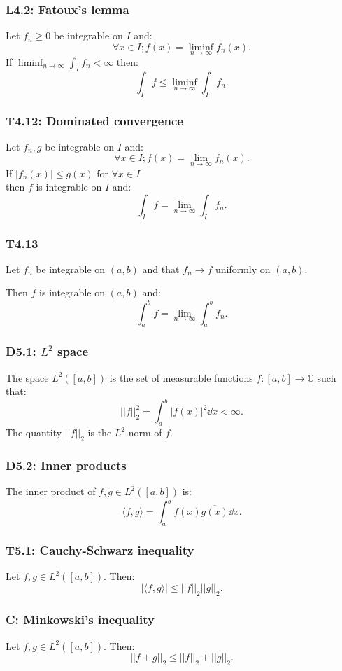 \documentclass{article}
\begin{document}
\begin{multicols*}{3}
\subsubsection*{L4.2: Fatoux's lemma}
Let $f_n\geq0$ be integrable on $I$ and:
$$\forall x\in I;f(x)=\liminf_{n\rightarrow\infty}f_n(x).$$
If $\displaystyle\liminf_{n\rightarrow\infty}
\int_I f_n<\infty$ then:
$$\int_I f\leq\liminf_{n\rightarrow\infty}\int_I f_n.$$

\subsubsection*{T4.12: Dominated convergence}
Let $f_n,g$ be integrable on $I$ and:
$$\forall x\in I; f(x)=\lim_{n\rightarrow\infty}f_n(x).$$
If $|f_n(x)|\leq g(x)$ for $\forall x\in I$ \\
then $f$ is integrable on $I$ and:
$$\int_I f=\lim_{n\rightarrow\infty}\int_I f_n.$$

\subsubsection*{T4.13}
Let $f_n$ be integrable on $(a,b)$ and that
$f_n\rightarrow f$ uniformly on $(a,b)$.

Then $f$ is integrable on $(a,b)$ and:
$$\int_{a}^{b}f=\lim_{n\rightarrow\infty}\int_{a}^{b}f_n.$$

\subsubsection*{D5.1: $L^2$ space}
The space $L^2([a,b])$ is the set of measurable functions 
$f:[a,b]\rightarrow\mathbb{C}$ such that:
$$||f||_2^2=\int_{a}^{b}|f(x)|^2\dd x<\infty.$$
The quantity $||f||_2$ is the $L^2$-norm of $f$.

\subsubsection*{D5.2: Inner products}
The inner product of $f,g\in L^2([a,b])$ is:
$$\langle f,g\rangle=
\int_{a}^{b}f(x)\overline{g(x)}\dd x.$$

\subsubsection*{T5.1: Cauchy-Schwarz inequality}
Let $f,g\in L^2([a,b])$. Then:
$$|\langle f,g\rangle|\leq||f||_2||g||_2.$$

\subsubsection*{C: Minkowski's inequality}
Let $f,g\in L^2([a,b])$. Then:
$$||f+g||_2\leq||f||_2+||g||_2.$$


\end{multicols*}
\end{document}
